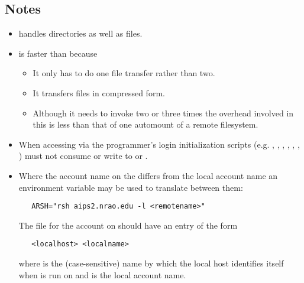 \subsection*{Notes}
 
\begin{itemize}
\item
    handles directories as well as files.

\item
    is faster than  because

   \begin{itemize}
   \item
      It only has to do one file transfer rather than two.

   \item
      It transfers files in compressed form.

   \item
      Although it needs to invoke  two or three times the
      overhead involved in this is less than that of one automount of a
      remote filesystem.
   \end{itemize}

\item
   When accessing  via  the programmer's
   login initialization scripts (e.g. , ,
   , , , , )
   must not consume  or write to  or .

\item
   Where the account name on the  differs from the local
   account name an environment variable may be used to translate between them:

\begin{verbatim}
   ARSH="rsh aips2.nrao.edu -l <remotename>"
\end{verbatim}

   \noindent
   The  file for the  account on
    should have an entry of the form

\begin{verbatim}
   <localhost> <localname>
\end{verbatim}

   \noindent
   where  is the (case-sensitive) name by which the local
   host identifies itself when  is run on
    and  is the local account name.


\end{itemize}
